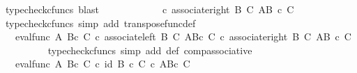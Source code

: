 \begin{isabellebody}
\ {\isacharparenleft}{\kern0pt}typecheck{\isacharunderscore}{\kern0pt}cfuncs{\isacharcomma}{\kern0pt}\ blast{\isacharparenright}{\kern0pt}\isanewline
\ \ \ \ \ \ \isamarkupfalse%
\ \isamarkupfalse%
\ {\isachardoublequoteopen}{\isachardot}{\kern0pt}{\isachardot}{\kern0pt}{\isachardot}{\kern0pt}\ {\isacharequal}{\kern0pt}\ {\isasymphi}\ {\isasymcirc}\isactrlsub c\ {\isacharparenleft}{\kern0pt}associate{\isacharunderscore}{\kern0pt}right\ B\ C\ {\isacharparenleft}{\kern0pt}A\isactrlbsup {\isacharparenleft}{\kern0pt}B\ {\isasymtimes}\isactrlsub c\ C{\isacharparenright}{\kern0pt}\isactrlesup {\isacharparenright}{\kern0pt}{\isacharparenright}{\kern0pt}{\isachardoublequoteclose}\isanewline
\ \ \ \ \ \ \ \ \isamarkupfalse%
\ {\isacharparenleft}{\kern0pt}typecheck{\isacharunderscore}{\kern0pt}cfuncs{\isacharcomma}{\kern0pt}\ simp\ add{\isacharcolon}{\kern0pt}\ transpose{\isacharunderscore}{\kern0pt}func{\isacharunderscore}{\kern0pt}def{\isacharparenright}{\kern0pt}\isanewline
\ \ \ \ \ \ \isamarkupfalse%
\ \isamarkupfalse%
\ {\isachardoublequoteopen}{\isachardot}{\kern0pt}{\isachardot}{\kern0pt}{\isachardot}{\kern0pt}\ {\isacharequal}{\kern0pt}\ {\isacharparenleft}{\kern0pt}eval{\isacharunderscore}{\kern0pt}func\ A\ {\isacharparenleft}{\kern0pt}B{\isasymtimes}\isactrlsub c\ C{\isacharparenright}{\kern0pt}{\isacharparenright}{\kern0pt}\ {\isasymcirc}\isactrlsub c\ {\isacharparenleft}{\kern0pt}{\isacharparenleft}{\kern0pt}associate{\isacharunderscore}{\kern0pt}left\ B\ C\ {\isacharparenleft}{\kern0pt}A\isactrlbsup {\isacharparenleft}{\kern0pt}B{\isasymtimes}\isactrlsub c\ C{\isacharparenright}{\kern0pt}\isactrlesup {\isacharparenright}{\kern0pt}{\isacharparenright}{\kern0pt}\ {\isasymcirc}\isactrlsub c\ {\isacharparenleft}{\kern0pt}associate{\isacharunderscore}{\kern0pt}right\ B\ C\ {\isacharparenleft}{\kern0pt}A\isactrlbsup {\isacharparenleft}{\kern0pt}B\ {\isasymtimes}\isactrlsub c\ C{\isacharparenright}{\kern0pt}\isactrlesup {\isacharparenright}{\kern0pt}{\isacharparenright}{\kern0pt}{\isacharparenright}{\kern0pt}{\isachardoublequoteclose}\isanewline
\ \ \ \ \ \ \ \ \isamarkupfalse%
\ {\isacharparenleft}{\kern0pt}typecheck{\isacharunderscore}{\kern0pt}cfuncs{\isacharcomma}{\kern0pt}\ simp\ add{\isacharcolon}{\kern0pt}\ {\isasymphi}{\isacharunderscore}{\kern0pt}def\ comp{\isacharunderscore}{\kern0pt}associative{}{\isacharparenright}{\kern0pt}\ \ \isanewline
\ \ \ \ \ \ \isamarkupfalse%
\ \isamarkupfalse%
\ {\isachardoublequoteopen}{\isachardot}{\kern0pt}{\isachardot}{\kern0pt}{\isachardot}{\kern0pt}\ {\isacharequal}{\kern0pt}\ eval{\isacharunderscore}{\kern0pt}func\ A\ {\isacharparenleft}{\kern0pt}B{\isasymtimes}\isactrlsub c\ C{\isacharparenright}{\kern0pt}\ {\isasymcirc}\isactrlsub c\ id\ {\isacharparenleft}{\kern0pt}{\isacharparenleft}{\kern0pt}B\ {\isasymtimes}\isactrlsub c\ C{\isacharparenright}{\kern0pt}\ {\isasymtimes}\isactrlsub c\ {\isacharparenleft}{\kern0pt}A\isactrlbsup {\isacharparenleft}{\kern0pt}B{\isasymtimes}\isactrlsub c\ C{\isacharparenright}{\kern0pt}\isactrlesup {\isacharparenright}{\kern0pt}{\isacharparenright}{\kern0pt}{\isachardoublequoteclose}\isanewline

\end{isabellebody}
